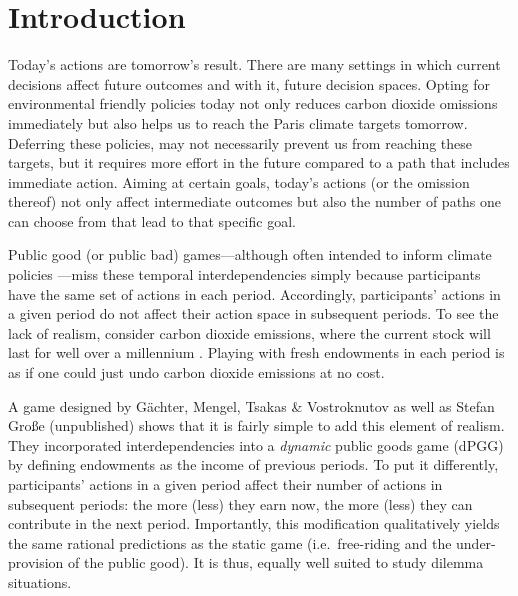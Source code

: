 \documentclass[
  authoryear,
  review,
  3p,
  onecolumn]{elsarticle}
\begin{document}
\hypertarget{sec-intro}{%
\section{Introduction}\label{sec-intro}}

Today's actions are tomorrow's result. There are many settings in which
current decisions affect future outcomes and with it, future decision
spaces. Opting for environmental friendly policies today not only
reduces carbon dioxide omissions immediately but also helps us to reach
the Paris climate targets tomorrow. Deferring these policies, may not
necessarily prevent us from reaching these targets, but it requires more
effort in the future compared to a path that includes immediate action.
Aiming at certain goals, today's actions (or the omission thereof) not
only affect intermediate outcomes but also the number of paths one can
choose from that lead to that specific goal.

Public good (or public bad) games---although often intended to inform
climate policies
\citep[e.g.][]{MilinskiEtAl2006, TavoniEtAl2011, Hauser2014, BrickEtAl2015, GomezEtAl2018, CalzolariEtAl2018, CookEtAl2019}---miss
these temporal interdependencies simply because participants have the
same set of actions in each period. Accordingly, participants' actions
in a given period do not affect their action space in subsequent
periods. To see the lack of realism, consider carbon dioxide emissions,
where the current stock will last for well over a millennium
\citep{Inman2008, CalzolariEtAl2018}. Playing with fresh endowments in
each period is as if one could just undo carbon dioxide emissions at no
cost.

A game designed by Gächter, Mengel, Tsakas \& Vostroknutov \citeyearpar[
hereafter, GMTV]{GMTV2017} as well as Stefan Große (unpublished) shows
that it is fairly simple to add this element of realism. They
incorporated interdependencies into a \emph{dynamic} public goods game
(dPGG) by defining endowments as the income of previous periods. To put
it differently, participants' actions in a given period affect their
number of actions in subsequent periods: the more (less) they earn now,
the more (less) they can contribute in the next period. Importantly,
this modification qualitatively yields the same rational predictions as
the static game (i.e.~free-riding and the under-provision of the public
good). It is thus, equally well suited to study dilemma situations.
\end{document}

